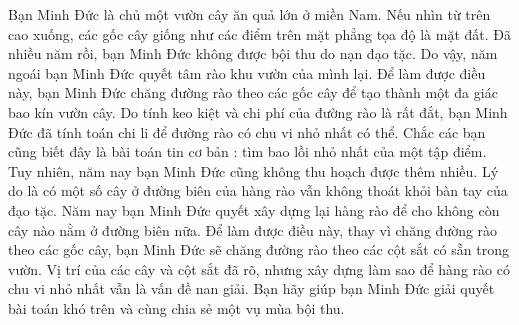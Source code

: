 Bạn Minh Đức là chủ một vườn cây ăn quả lớn ở miền Nam. Nếu nhìn từ trên cao xuống, các gốc cây giống như các điểm trên mặt phẳng tọa độ là mặt đất. Đã nhiều năm rồi, bạn Minh Đức không được bội thu do nạn đạo tặc. Do vậy, năm ngoái bạn Minh Đức quyết tâm rào khu vườn của mình lại. Để làm được điều này, bạn Minh Đức chăng đường rào theo các gốc cây để tạo thành một đa giác bao kín vườn cây. Do tính keo kiệt và chi phí của đường rào là rất đắt, bạn Minh Đức đã tính toán chi li để đường rào có chu vi nhỏ nhất có thể. Chắc các bạn cũng biết đây là bài toán tin cơ bản : tìm bao lồi nhỏ nhất của một tập điểm. Tuy nhiên, năm nay bạn Minh Đức cũng không thu hoạch được thêm nhiều. Lý do là có một số cây ở đường biên của hàng rào vẫn không thoát khỏi bàn tay của đạo tặc. Năm nay bạn Minh Đức quyết xây dựng lại hàng rào để cho không còn cây nào nằm ở đường biên nữa. Để làm được điều này, thay vì chăng đường rào theo các gốc cây, bạn Minh Đức sẽ chăng đường rào theo các cột sắt có sẵn trong vườn. Vị trí của các cây và cột sắt đã rõ, nhưng xây dựng làm sao để hàng rào có chu vi nhỏ nhất vẫn là vấn đề nan giải. Bạn hãy giúp bạn Minh Đức giải quyết bài toán khó trên và cùng chia sẻ một vụ mùa bội thu.